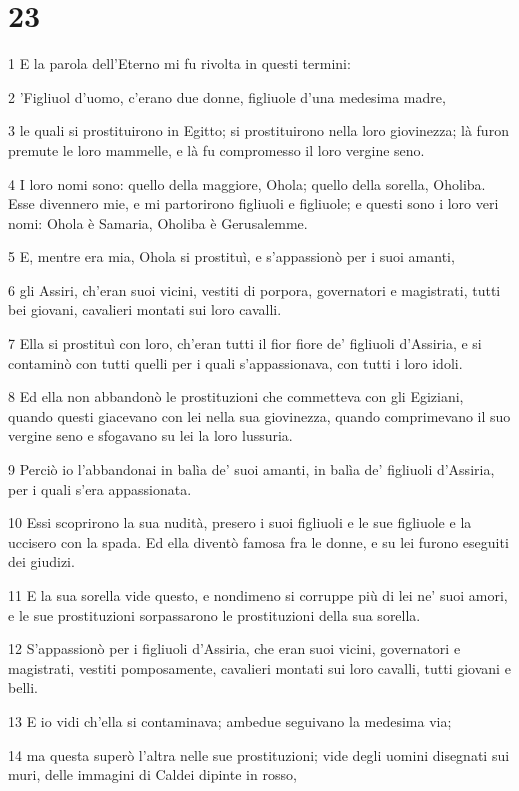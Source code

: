 \chapter{23}

\par 1 E la parola dell'Eterno mi fu rivolta in questi termini:
\par 2 'Figliuol d'uomo, c'erano due donne, figliuole d'una medesima madre,
\par 3 le quali si prostituirono in Egitto; si prostituirono nella loro giovinezza; là furon premute le loro mammelle, e là fu compromesso il loro vergine seno.
\par 4 I loro nomi sono: quello della maggiore, Ohola; quello della sorella, Oholiba. Esse divennero mie, e mi partorirono figliuoli e figliuole; e questi sono i loro veri nomi: Ohola è Samaria, Oholiba è Gerusalemme.
\par 5 E, mentre era mia, Ohola si prostituì, e s'appassionò per i suoi amanti,
\par 6 gli Assiri, ch'eran suoi vicini, vestiti di porpora, governatori e magistrati, tutti bei giovani, cavalieri montati sui loro cavalli.
\par 7 Ella si prostituì con loro, ch'eran tutti il fior fiore de' figliuoli d'Assiria, e si contaminò con tutti quelli per i quali s'appassionava, con tutti i loro idoli.
\par 8 Ed ella non abbandonò le prostituzioni che commetteva con gli Egiziani, quando questi giacevano con lei nella sua giovinezza, quando comprimevano il suo vergine seno e sfogavano su lei la loro lussuria.
\par 9 Perciò io l'abbandonai in balìa de' suoi amanti, in balìa de' figliuoli d'Assiria, per i quali s'era appassionata.
\par 10 Essi scoprirono la sua nudità, presero i suoi figliuoli e le sue figliuole e la uccisero con la spada. Ed ella diventò famosa fra le donne, e su lei furono eseguiti dei giudizi.
\par 11 E la sua sorella vide questo, e nondimeno si corruppe più di lei ne' suoi amori, e le sue prostituzioni sorpassarono le prostituzioni della sua sorella.
\par 12 S'appassionò per i figliuoli d'Assiria, che eran suoi vicini, governatori e magistrati, vestiti pomposamente, cavalieri montati sui loro cavalli, tutti giovani e belli.
\par 13 E io vidi ch'ella si contaminava; ambedue seguivano la medesima via;
\par 14 ma questa superò l'altra nelle sue prostituzioni; vide degli uomini disegnati sui muri, delle immagini di Caldei dipinte in rosso,
